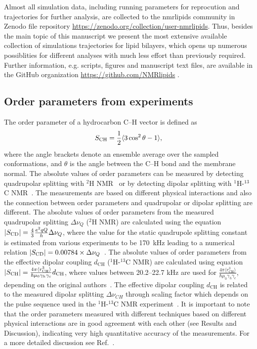 \documentclass[journal=jacsat,manuscript=article]{achemso}
\begin{document}
Almost all simulation data, including running parameters for reprocution and trajectories for further analysis, are collected
to the nmrlipids community in Zenodo file repository \url{https://zenodo.org/collection/user-nmrlipids}.
Thus, besides the main topic of this manuscript we present the most extensive available collection of simulations trajectories
for lipid bilayers, which opens up numerous possiblities for different analyses with much less effort than previously required.
Further information, e.g. scripts, figures and manuscript text files, are available in the GitHub 
organization \url{https://github.com/NMRlipids} .


\subsection{Order parameters from experiments}\label{expORDp}
The order parameter of a hydrocarbon C--H vector is defined as 
\begin{equation}\label{orderP}
S_{{\rm CH}}=\frac{1}{2}\langle 3 \cos^2 \theta-1 \rangle,
\end{equation} 
where the angle brackets denote an ensemble average over the sampled conformations, and $\theta$ is the angle between the C--H bond and the membrane normal.
The absolute values of order parameters can be measured by detecting quadrupolar splitting with $^2$H NMR~\cite{seelig77c} or by detecting dipolar 
splitting with $^1$H-$^{13}$C NMR~\cite{hong95a,gross97,dvinskikh05a,ferreira13}. The measurements are based on
different physical interactions and also the connection between order parameters and quadrupolar or dipolar splitting
are different. The absolute values of order parameters from the measured quadrupolar splitting $\Delta \nu_Q$ ($^2$H NMR) are calculated using 
the equation $|S_{{\rm CD}}|=\frac{4}{3} \frac{e^2qQ}{h} \Delta \nu_Q$, where the value for the static quadrupole
splitting constant is estimated from various experiments to be 170~kHz leading to a numerical relation $|S_{{\rm CD}}|=0.00784 \times \Delta \nu_Q$~\cite{seelig77c}. 
The absolute values of order parameters from the effective dipolar coupling $d_\mathrm{CH}$ ($^1$H-$^{13}$C NMR) are calculated using equation
$|S_{{\rm CH}}|=\frac{4\pi\langle r_\mathrm{CH}^3 \rangle}{\hbar \mu_0 \gamma_h \gamma_c} d_\mathrm{CH}$, where
values between 20.2--22.7 kHz are used for $\frac{4\pi\langle r_\mathrm{CH}^3 \rangle}{\hbar \mu_0 \gamma_h \gamma_c}$,
depending on the original authors~\cite{hong95a,gross97,dvinskikh05a,ferreira13}.
The effective dipolar coupling $d_\mathrm{CH}$ is related to the measured dipolar splitting $\Delta \nu_{CH}$ 
through scaling factor which depends on the pulse sequence used in the $^1$H-$^{13}$C NMR experiment~\cite{hong95a,gross97,dvinskikh05a,ferreira13}.
It is important to note that the order parameters measured with different techniques based on different physical interactions are in good agreement
with each other (see Results and Discussion), indicating very high quantitative accuracy of the measurements.
For a more detailed discussion see Ref.~. 
\end{document}
